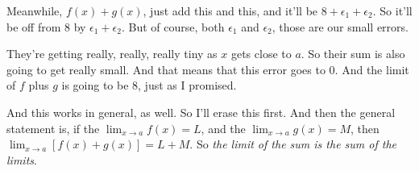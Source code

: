 \documentclass[pdftex, brazil, 12pt, twoside]{article}
\begin{document}
Meanwhile, $f(x) + g(x)$, just add this and this,
and it'll be $8 + \epsilon_1 + \epsilon_2$.
So it'll be off from $8$ by $\epsilon_1 + \epsilon_2$.
But of course, both $\epsilon_1$ and $\epsilon_2$,
those are our small errors.

They're getting really, really, really tiny
as $x$ gets close to $a$.
So their sum is also going to get really small.
And that means that this error goes to $0$.
And the limit of $f$ plus $g$ is going
to be $8$, just as I promised.

\begin{figure}[H]
  \begin{center}
  \end{center}
\end{figure}

And this works in general, as well.
So I'll erase this first.
And then the general statement is,
if the $\displaystyle \lim_{x \to a}f(x) = L$,
and the $\displaystyle \lim_{x \to a}g(x) = M$,
then $\displaystyle \lim_{x \to a}\left[f(x)+g(x)\right] = L+M$.
So \emph{the limit of the sum is the sum of the limits}.

\begin{figure}[H]
  \begin{center}
  \end{center}
\end{figure}
\end{document}
